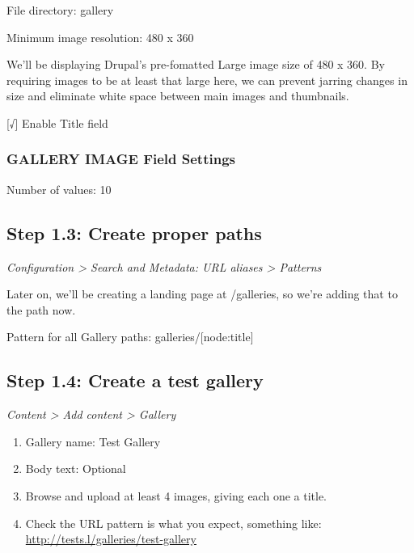 \documentclass[letterpaper,10pt,english]{sphinxmanual}
\begin{document}
File directory: gallery

Minimum image resolution: 480 x 360

We’ll be displaying Drupal’s pre-fomatted Large image size of 480 x 360. By requiring images to be at least that large here, we can prevent jarring changes in size and eliminate white space between main images and thumbnails.

{[}√{]} Enable Title field


\subsubsection{GALLERY IMAGE Field Settings}
\label{recipe:gallery-image-field-settings}
Number of values: 10


\subsection{Step 1.3: Create proper paths}
\label{recipe:step-1-3-create-proper-paths}
\emph{Configuration \textgreater{} Search and Metadata: URL aliases \textgreater{} Patterns}

Later on, we’ll be creating a landing page at /galleries, so we’re adding that to the path now.

Pattern for all Gallery paths: galleries/{[}node:title{]}


\subsection{Step 1.4: Create a test gallery}
\label{recipe:step-1-4-create-a-test-gallery}
\emph{Content \textgreater{} Add content \textgreater{} Gallery}
\begin{enumerate}
\item {} 
Gallery name: Test Gallery

\item {} 
Body text: Optional

\item {} 
Browse and upload at least 4 images, giving each one a title.

\item {} 
Check the URL pattern is what you expect, something like: \href{http://tests.l/galleries/test-gallery}{http://tests.l/galleries/test-gallery}

\end{enumerate}
\end{document}
